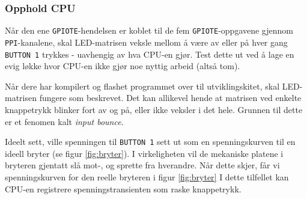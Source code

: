 \subsubsection{Opphold CPU}

Når den ene \verb|GPIOTE|-hendelsen er koblet til de fem \verb|GPIOTE|-oppgavene gjennom \verb|PPI|-kanalene, skal LED-matrisen veksle mellom å være av eller på hver gang \verb|BUTTON 1| trykkes - uavhengig av hva CPU-en gjør. Test dette ut ved å lage en evig løkke hvor CPU-en ikke gjør noe nyttig arbeid (altså tom).

Når dere har kompilert og flashet programmet over til utviklingskitet, skal LED-matrisen fungere som beskrevet. Det kan allikevel hende at matrisen ved enkelte knappetrykk blinker fort av og på, eller ikke veksler i det hele. Grunnen til dette er et fenomen kalt \textit{input bounce}.

Ideelt sett, ville spenningen til \verb|BUTTON 1| sett ut som en spenningskurven til en ideell bryter (se figur \ref{fig:bryter}). I virkeligheten vil de mekaniske platene i bryteren gjentatt slå mot-, og sprette fra hverandre. Når dette skjer, får vi spenningskurven for den reelle bryteren i figur \ref{fig:bryter} I dette tilfellet kan CPU-en registrere spenningstransienten som raske knappetrykk.

